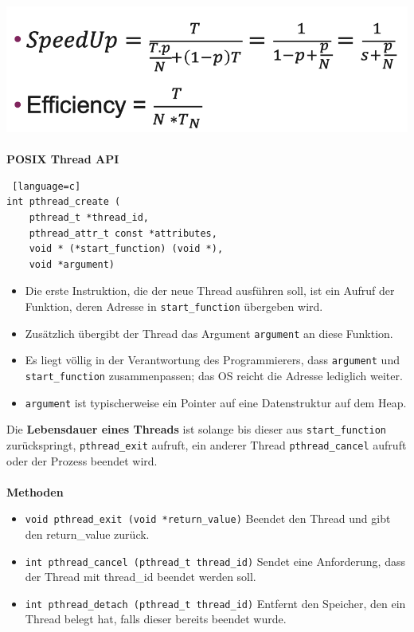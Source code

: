 \documentclass[8pt]{extarticle}
\let\oldtextbf\textbf
\renewcommand{\textbf}{\tiny\oldtextbf}
\begin{document}
\begin{multicols*}{5}
	\includegraphics[scale=0.3]{amdahl.png}\\\\
	\textbf{POSIX Thread API}
	\begin{lstlisting} [language=c]
int pthread_create (
	pthread_t *thread_id,
	pthread_attr_t const *attributes,
	void * (*start_function) (void *),
	void *argument)
	\end{lstlisting}
	\begin{itemize} [noitemsep, topsep=0pt, leftmargin=*]
		\item Die erste Instruktion, die der neue Thread ausführen soll, ist ein Aufruf der Funktion, deren Adresse in \texttt{start\_function} übergeben wird.
		\item Zusätzlich übergibt der Thread das Argument \texttt{argument} an diese Funktion.
		\item Es liegt völlig in der Verantwortung des Programmierers, dass \texttt{argument} und \texttt{start\_function} zusammenpassen; das OS reicht die Adresse lediglich weiter.
		\item \texttt{argument} ist typischerweise ein Pointer auf eine Datenstruktur auf dem Heap.
	\end{itemize}
	Die \textbf{Lebensdauer eines Threads} ist solange bis dieser aus \texttt{start\_function} zurückspringt, \texttt{pthread\_exit} aufruft, ein anderer Thread \texttt{pthread\_cancel} aufruft oder der Prozess beendet wird.\\\\
	\textbf{Methoden}
	\begin{itemize} [noitemsep, topsep=0pt, leftmargin=*]
		\item \texttt{void pthread\_exit (void *return\_value)} Beendet den Thread und gibt den return\_value zurück.
		\item \texttt{int pthread\_cancel (pthread\_t thread\_id)} Sendet eine Anforderung, dass der Thread mit thread\_id beendet werden soll.
		\item \texttt{int pthread\_detach (pthread\_t thread\_id)} Entfernt den Speicher, den ein Thread belegt hat, falls dieser bereits beendet wurde.

\end{itemize}
\end{multicols*}
\end{document}
